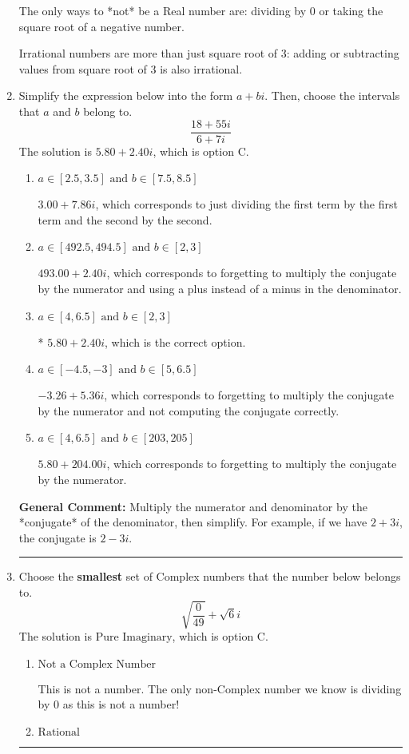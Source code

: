 \documentclass{extbook}[14pt]
\newcommand{\litem}[1]{\item #1

\rule{\textwidth}{0.4pt}}
\begin{document}
\begin{enumerate}
{ The only ways to *not* be a Real number are: dividing by 0 or taking the square root of a negative number. 
 
 Irrational numbers are more than just square root of 3: adding or subtracting values from square root of 3 is also irrational.
}
\litem{
Simplify the expression below into the form $a+bi$. Then, choose the intervals that $a$ and $b$ belong to.
\[ \frac{18 + 55 i}{6 + 7 i} \]The solution is \( 5.80  + 2.40 i \), which is option C.\begin{enumerate}[label=\Alph*.]
\item \( a \in [2.5, 3.5] \text{ and } b \in [7.5, 8.5] \)

 $3.00  + 7.86 i$, which corresponds to just dividing the first term by the first term and the second by the second.
\item \( a \in [492.5, 494.5] \text{ and } b \in [2, 3] \)

 $493.00  + 2.40 i$, which corresponds to forgetting to multiply the conjugate by the numerator and using a plus instead of a minus in the denominator.
\item \( a \in [4, 6.5] \text{ and } b \in [2, 3] \)

* $5.80  + 2.40 i$, which is the correct option.
\item \( a \in [-4.5, -3] \text{ and } b \in [5, 6.5] \)

 $-3.26  + 5.36 i$, which corresponds to forgetting to multiply the conjugate by the numerator and not computing the conjugate correctly.
\item \( a \in [4, 6.5] \text{ and } b \in [203, 205] \)

 $5.80  + 204.00 i$, which corresponds to forgetting to multiply the conjugate by the numerator.
\end{enumerate}

\textbf{General Comment:} Multiply the numerator and denominator by the *conjugate* of the denominator, then simplify. For example, if we have $2+3i$, the conjugate is $2-3i$.
}
\litem{
Choose the \textbf{smallest} set of Complex numbers that the number below belongs to.
\[ \sqrt{\frac{0}{49}}+\sqrt{6}i \]The solution is \( \text{Pure Imaginary} \), which is option C.\begin{enumerate}[label=\Alph*.]
\item \( \text{Not a Complex Number} \)

This is not a number. The only non-Complex number we know is dividing by 0 as this is not a number!
\item \( \text{Rational} \)


\end{enumerate}}
\end{enumerate}
\end{document}
